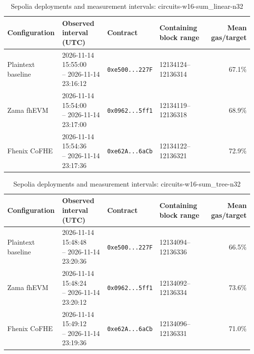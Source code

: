 \begin{table}[!t]
\caption{Sepolia deployments and measurement intervals: circuits-w16-sum\_linear-n32}
\label{tab:sepolia-circuits-w16-sum-linear-n32}
\centering
\footnotesize
\setlength{\tabcolsep}{4pt}
\begin{tabular}{|l|l|l|l|r|}
\hline
\textbf{Configuration} & \textbf{Observed interval (UTC)} & \textbf{Contract} & \textbf{Containing block range} & \textbf{Mean gas/target} \\
\hline
Plaintext baseline & \shortstack[l]{2026-11-14 15:55:00 \\ -- 2026-11-14 23:16:12} & \texttt{0xe500...227F} & 12134124--12136314 & 67.1\% \\
\hline
Zama fhEVM & \shortstack[l]{2026-11-14 15:54:00 \\ -- 2026-11-14 23:17:00} & \texttt{0x0962...5ff1} & 12134119--12136318 & 68.9\% \\
\hline
Fhenix CoFHE & \shortstack[l]{2026-11-14 15:54:36 \\ -- 2026-11-14 23:17:36} & \texttt{0xe62A...6aCb} & 12134122--12136321 & 72.9\% \\
\hline
\end{tabular}
\end{table}

\begin{table}[!t]
\caption{Sepolia deployments and measurement intervals: circuits-w16-sum\_tree-n32}
\label{tab:sepolia-circuits-w16-sum-tree-n32}
\centering
\footnotesize
\setlength{\tabcolsep}{4pt}
\begin{tabular}{|l|l|l|l|r|}
\hline
\textbf{Configuration} & \textbf{Observed interval (UTC)} & \textbf{Contract} & \textbf{Containing block range} & \textbf{Mean gas/target} \\
\hline
Plaintext baseline & \shortstack[l]{2026-11-14 15:48:48 \\ -- 2026-11-14 23:20:36} & \texttt{0xe500...227F} & 12134094--12136336 & 66.5\% \\
\hline
Zama fhEVM & \shortstack[l]{2026-11-14 15:48:24 \\ -- 2026-11-14 23:20:12} & \texttt{0x0962...5ff1} & 12134092--12136334 & 73.6\% \\
\hline
Fhenix CoFHE & \shortstack[l]{2026-11-14 15:49:12 \\ -- 2026-11-14 23:19:36} & \texttt{0xe62A...6aCb} & 12134096--12136331 & 71.0\% \\
\hline
\end{tabular}
\end{table}

